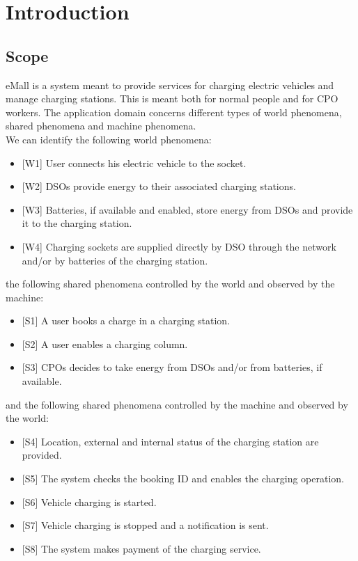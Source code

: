 \documentclass[a4paper]{report}
\begin{document}
\tableofcontents
\listoffigures
\begingroup
\let\clearpage\relax %
\listoftables
\endgroup
\restoregeometry
\chapter{Introduction}
\section{Scope}
eMall is a system meant to provide services for charging electric vehicles and manage charging stations. This is meant both for normal people and for CPO workers. 
The application domain concerns different types of world phenomena, shared phenomena and machine phenomena. \\
We can identify the following world phenomena:
\begin{itemize}
\item {[W1]} \label{W1}User connects his electric vehicle to the socket.
\item {[W2]} \label{W2}DSOs provide energy to their associated charging stations.
\item {[W3]} \label{W3}Batteries, if available and enabled, store energy from DSOs and provide it to the charging station.
\item {[W4]} \label{W4}Charging sockets are supplied directly by DSO through the network and/or by batteries of the charging station.
\end{itemize} 
the following shared phenomena controlled by the world and observed by the machine:
\begin{itemize}
\item {[S1]} A user books a charge in a charging station.
\item {[S2]} A user enables a charging column.
\item {[S3]} CPOs decides to take energy from DSOs and/or from batteries, if available.
\end{itemize}
and the following shared phenomena controlled by the machine and observed by the world:
\begin{itemize}
\item {[S4]} Location, external and internal status of the charging station are provided.
\item {[S5]} The system checks the booking ID and enables the charging operation.
\item {[S6]} Vehicle charging is started.
\item {[S7]} Vehicle charging is stopped and a notification is sent.
\item {[S8]} The system makes payment of the charging service.
\end{itemize}
\end{document}
